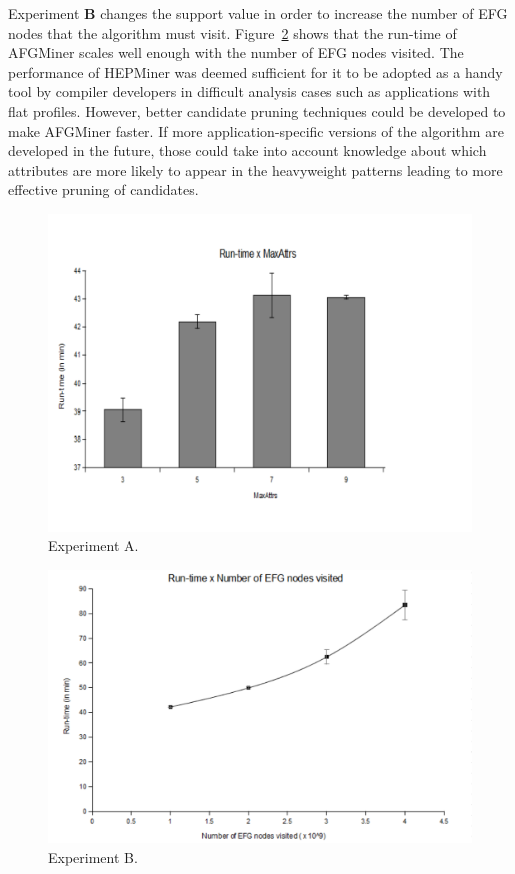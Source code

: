 Experiment {\bf B} changes the support value in order to increase the number of EFG nodes that the algorithm must visit. Figure~\ref{fig:Plot1} shows that the run-time of AFGMiner scales well enough with the number of EFG nodes visited. The performance of HEPMiner was deemed sufficient for it to be adopted as a handy tool by compiler developers in difficult analysis cases such as applications with flat profiles. However, better candidate pruning techniques could be developed to make AFGMiner faster. If more application-specific versions of the algorithm are developed in the future, those could take into account knowledge about which attributes are more likely to appear in the heavyweight patterns leading to more effective pruning of candidates.
\begin{figure}[h!]
\centering
    \includegraphics[scale=0.4]{figures/plot2.pdf}
    \caption{Experiment A.}
    \label{fig:Plot2}  
\end{figure}

\begin{figure}[h!]
\centering
    \includegraphics[scale=0.4]{figures/plot1.pdf}
    \caption{Experiment B.}
    \label{fig:Plot1}  
\end{figure}
